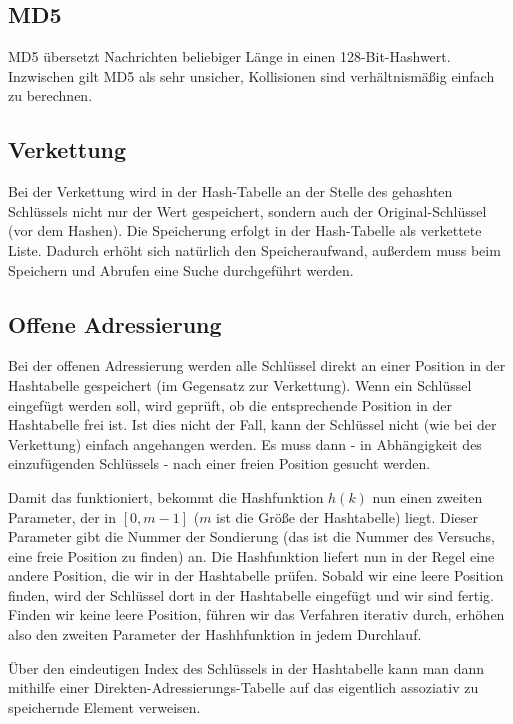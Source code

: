 \documentclass[12pt]{article}
\begin{document}
\subsection{MD5}

MD5 übersetzt Nachrichten beliebiger Länge in einen 128-Bit-Hashwert. Inzwischen gilt MD5 als sehr unsicher, Kollisionen sind verhältnismäßig einfach zu berechnen.

\subsection{Verkettung}

Bei der Verkettung wird in der Hash-Tabelle an der Stelle des gehashten Schlüssels nicht nur der Wert gespeichert, sondern auch der Original-Schlüssel (vor dem Hashen). Die Speicherung erfolgt in der Hash-Tabelle als verkettete Liste. Dadurch erhöht sich natürlich den Speicheraufwand, außerdem muss beim Speichern und Abrufen eine Suche durchgeführt werden.

\subsection{Offene Adressierung}

Bei der offenen Adressierung werden alle Schlüssel direkt an einer Position in der Hashtabelle gespeichert (im Gegensatz zur Verkettung). Wenn ein Schlüssel eingefügt werden soll, wird geprüft, ob die entsprechende Position in der Hashtabelle frei ist. Ist dies nicht der Fall, kann der Schlüssel nicht (wie bei der Verkettung) einfach angehangen werden. Es muss dann - in Abhängigkeit des einzufügenden Schlüssels - nach einer freien Position gesucht werden.

Damit das funktioniert, bekommt die Hashfunktion $h(k)$ nun einen zweiten Parameter, der in $[0,m-1]$ ($m$ ist die Größe der Hashtabelle) liegt. Dieser Parameter gibt die Nummer der Sondierung (das ist die Nummer des Versuchs, eine freie Position zu finden) an. Die Hashfunktion liefert nun in der Regel eine andere Position, die wir in der Hashtabelle prüfen. Sobald wir eine leere Position finden, wird der Schlüssel dort in der Hashtabelle eingefügt und wir sind fertig. Finden wir keine leere Position, führen wir das Verfahren iterativ durch, erhöhen also den zweiten Parameter der Hashhfunktion in jedem Durchlauf.

Über den eindeutigen Index des Schlüssels in der Hashtabelle kann man dann mithilfe einer Direkten-Adressierungs-Tabelle auf das eigentlich assoziativ zu speichernde Element verweisen.
\end{document}
